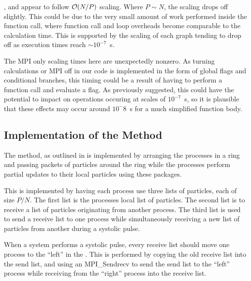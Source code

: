 \vZeroTimeExplanation
    {}
    {}
    {}
    {\individualoperation{}}
    {\systolicloop{}}

,
 and
appear to follow $\mathcal{O}{\left({ N/P }\right)}$ scaling.
%
Where $P \sim{} N$, the scaling drops off slightly.
%
This could be due to the very small amount of work performed
inside the function call, where function call and loop overheads
become comparable to the calculation time.
%
This is supported by the scaling of each graph tending to drop off
as execution times reach $\sim{} 10^{-7}$~s.

The MPI only scaling times here are unexpectedly nonzero.
%
As turning calculations or MPI off in our code is implemented in
the form of global flags and conditional branches, this timing
could be a result of having to perform a function call and
evaluate a flag.
%
As previously suggested, this could have the potential to impact on
operations occuring at scales of $10^{-7}$~s, so it is plausible
that these effects may occur around $10^-{8}$~s for a much simplified
function body.


%
%

\subsection{Implementation of the \pairoperation{} Method}

The \pairoperation{} method, as outlined in 
is implemented by arranging the processes in a ring and passing
packets of particles around the ring while the processes perform
partial updates to their local particles using these packages.

This is implemented by having each process use three lists of particles,
each of size $P/N$.
%
The first list is the processes local list of particles.
%
The second list is to receive a list of particles originating from
another process.
%
The third list is used to send a receive list
to one process while simultaneously receiving a new
list of particles from another
during a systolic pulse.

When a system performs a systolic pulse,
every receive list should move one process
to the ``left'' in the \systolicloop{}.
%
This is performed by copying the old receive list into the
send list, and using an MPI\_Sendrecv to send the send list to
the ``left'' process while receiving from
the ``right'' process into the receive list.

